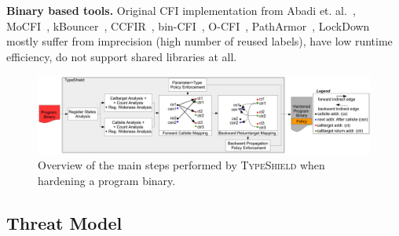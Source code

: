 \textbf{Binary based tools.} Original CFI implementation from Abadi et. al.~\cite{abadi:cfi2}, MoCFI~\cite{mocfi}, 
kBouncer~\cite{kbouncer}, 
CCFIR~\cite{ccfir:zhang}, bin-CFI~\cite{mingwei:sekar}, O-CFI~\cite{mohan:opaque}, 
PathArmor~\cite{veen:cfi}, 
LockDown~\cite{payer:dimva} mostly suffer from imprecision (high number of reused labels), 
have low runtime efficiency, do not support shared libraries at all.

% 

\begin{center}
\begin{figure}[t!]
\centering
   \includegraphics[width=.88\textwidth]{figures/overview.pdf}
    \caption{Overview of the main steps performed by \textsc{TypeShield} when hardening a program binary.}
    \label{System overview.}
    \vspace{-.5cm}
 \end{figure}
\end{center}

\subsection{Threat Model}
\label{Adversary Model}

